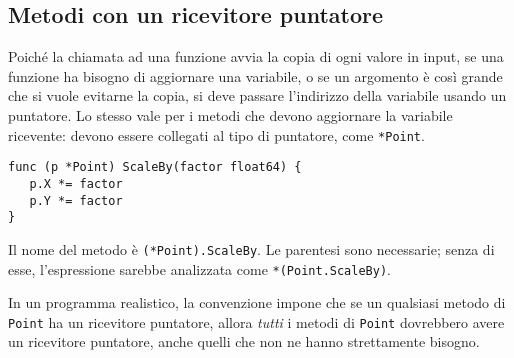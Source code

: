 \documentclass[../../thesis.tex]{subfiles}
\begin{document}
    \subsection{Metodi con un ricevitore puntatore}\label{subsec:metodi-con-un-ricevitore-puntatore}
    Poiché la chiamata ad una funzione avvia la copia di ogni valore in input, se una funzione ha bisogno di aggiornare una variabile, o se un argomento è così grande che si vuole evitarne la copia, si deve passare l'indirizzo della variabile usando un puntatore.
    Lo stesso vale per i metodi che devono aggiornare la variabile ricevente: devono essere collegati al tipo di puntatore, come \verb"*Point".
    \begin{lstlisting}[frame = single,label={lst:lstlisting5-2.1}]
func (p *Point) ScaleBy(factor float64) {
   p.X *= factor
   p.Y *= factor
}
    \end{lstlisting}
    Il nome del metodo è \verb"(*Point).ScaleBy".
    Le parentesi sono necessarie;
    senza di esse, l'espressione sarebbe analizzata come \verb"*(Point.ScaleBy)".
    \hfill \vspace{12pt}

    In un programma realistico, la convenzione impone che se un qualsiasi metodo di \verb"Point" ha un ricevitore puntatore, allora \textit{tutti} i metodi di \verb"Point" dovrebbero avere un ricevitore puntatore, anche quelli che non ne hanno strettamente bisogno.
    \hfill \vspace{12pt}
\end{document}
